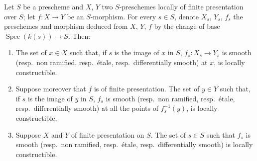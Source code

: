 \begin{proposition}[17.7.11]
\label{IV.17.7.11}
Let $S$ be a prescheme and $X$, $Y$ two $S$-preschemes locally of finite presentation over $S$; let $f:X\to Y$ be an $S$-morphism.
For every $s\in S$, denote $X_s$, $Y_s$, $f_s$ the preschemes and morphism deduced from $X$, $Y$, $f$ by the change of base $\operatorname{Spec}(k(s))\to S$.
Then:
\begin{enumerate}[label=(\roman*)]
  \item The set of $x\in X$ such that, if $s$ is the image of $x$ in $S$, $f_s:X_s\to Y_s$ is smooth (resp.\ non ramified, resp.\ \'etale, resp.\ differentially smooth) at $x$, is locally constructible.
  \item Suppose moreover that $f$ is of finite presentation.
  The set of $y\in Y$ such that, if $s$ is the image of $y$ in $S$, $f_s$ is smooth (resp.\ non ramified, resp.\ \'etale, resp.\ differentially smooth) at all the points of $f_s^{-1}(y)$, is locally constructible.
  \item Suppose $X$ and $Y$ of finite presentation on $S$.
  The set of $s\in S$ such that $f_s$ is smooth (resp.\ non ramified, resp.\ \'etale, resp.\ differentially smooth) is locally constructible.
\end{enumerate}
\end{proposition}

